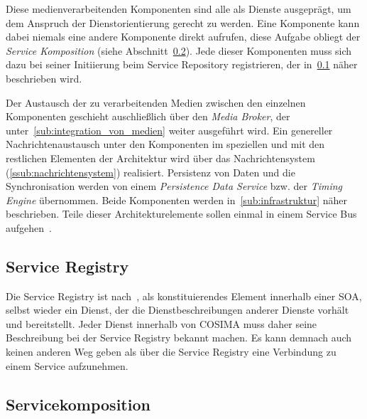   Diese medienverarbeitenden Komponenten sind alle als Dienste ausgeprägt, um dem Anspruch der Dienstorientierung gerecht zu werden. Eine Komponente kann dabei niemals eine andere Komponente direkt aufrufen, diese Aufgabe obliegt der \emph{Service Komposition} (siehe Abschnitt~\ref{sub:service_komposition}). Jede dieser Komponenten muss sich dazu bei seiner Initiierung beim Service Repository registrieren, der in~\ref{sub:service_registry} näher beschrieben wird.
  
  Der Austausch der zu verarbeitenden Medien zwischen den einzelnen Komponenten geschieht auschließlich über den \emph{Media Broker}, der unter~\ref{sub:integration_von_medien} weiter ausgeführt wird. Ein genereller Nachrichtenaustausch unter den Komponenten im speziellen und mit den restlichen Elementen der Architektur wird über das Nachrichtensystem (\ref{ssub:nachrichtensystem}) realisiert. Persistenz von Daten und die Synchronisation werden von einem \emph{Persistence Data Service} bzw. der \emph{Timing Engine} übernommen. Beide Komponenten werden in~\ref{sub:infrastruktur} näher beschrieben. Teile dieser Architekturelemente sollen einmal in einem Service Bus aufgehen~\citep[S. 18]{bericht}.


\subsection{Service Registry} %
\label{sub:service_registry}

  Die Service Registry ist nach~\citep{service_oriented_computing}, als konstituierendes Element innerhalb einer SOA, selbst wieder ein Dienst, der die Dienstbeschreibungen anderer Dienste vorhält und bereitstellt. Jeder Dienst innerhalb von COSIMA muss daher seine Beschreibung bei der Service Registry bekannt machen. Es kann demnach auch keinen anderen Weg geben als über die Service Registry eine Verbindung zu einem Service aufzunehmen.



\subsection{Servicekomposition} %
\label{sub:service_komposition}

